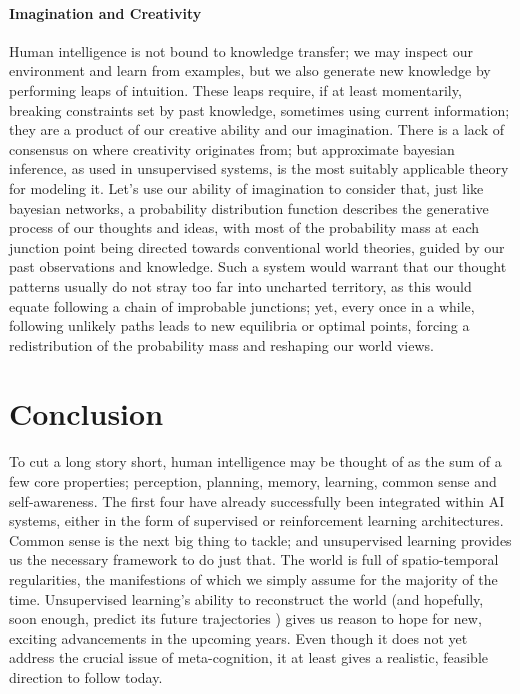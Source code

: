\documentclass[]{article}
\begin{document}
\paragraph{Imagination and Creativity} Human intelligence is not bound to knowledge transfer; we may inspect our environment and learn from examples, but we also generate new knowledge by performing leaps of intuition. These leaps require, if at least momentarily, breaking constraints set by past knowledge, sometimes using current information; they are a product of our creative ability and our imagination. There is a lack of consensus on where creativity originates from; but approximate bayesian inference, as used in unsupervised systems, is the most suitably applicable theory for modeling it. Let's use our ability of imagination to consider that, just like bayesian networks, a  probability distribution function describes the generative process of our thoughts and ideas, with most of the probability mass at each junction point being directed towards conventional world theories, guided by our past observations and knowledge. Such a system would warrant that our thought patterns usually do not stray too far into uncharted territory, as this would equate following a chain of improbable junctions; yet, every once in a while, following unlikely paths leads to new equilibria or optimal points, forcing a redistribution of the probability mass and reshaping our world views.

\section{Conclusion}
To cut a long story short, human intelligence may be thought of as the sum of a few core properties; perception, planning, memory, learning, common sense and self-awareness. The first four have already successfully been integrated within AI systems, either in the form of supervised or reinforcement learning architectures. Common sense is the next big thing to tackle; and unsupervised learning provides us the necessary framework to do just that. The world is full of spatio-temporal regularities, the manifestions of which we simply assume for the majority of the time. Unsupervised learning's ability to reconstruct the world (and hopefully, soon enough, predict its future trajectories \cite{lecun2016}) gives us reason to hope for new, exciting advancements in the upcoming years. Even though it does not yet address the crucial issue of meta-cognition, it at least gives a realistic, feasible direction to follow today.



\end{document}
